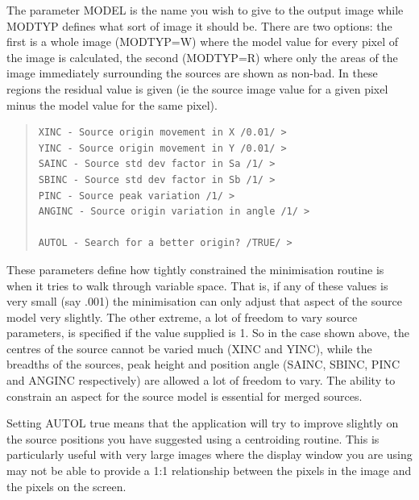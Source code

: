 \documentclass[twoside,11pt]{article}
\newenvironment{myquote}{\begin{quote}\begin{small}}{\end{small}\end{quote}}
\begin{document}
The parameter MODEL is the name you wish to give to the output image while 
MODTYP defines what sort of image it should be. There are two options: the
first is a whole image (MODTYP=W) where the model value for every pixel of the
image is calculated, the second (MODTYP=R) where only the areas of the image
immediately surrounding the sources are shown as non-bad. In these regions the 
residual value is given (ie the source image value for a given pixel
minus the model value for the same pixel).

\begin{myquote}
\begin{verbatim}
XINC - Source origin movement in X /0.01/ > 
YINC - Source origin movement in Y /0.01/ > 
SAINC - Source std dev factor in Sa /1/ > 
SBINC - Source std dev factor in Sb /1/ > 
PINC - Source peak variation /1/ > 
ANGINC - Source origin variation in angle /1/ > 
 
AUTOL - Search for a better origin? /TRUE/ > 
\end{verbatim}
\end{myquote}

These parameters define how tightly constrained the minimisation routine
is when it tries to walk through variable space. That is, if any of these
values is very small (say .001) the minimisation can only adjust that
aspect of the source model very slightly. The other extreme, a lot of freedom
to vary source parameters, is specified if the value supplied is 1. So in the 
case shown above, the centres of the source cannot be varied 
much (XINC and YINC), while the breadths of the sources, peak height and 
position angle (SAINC, SBINC, PINC and ANGINC respectively) are allowed
a lot of freedom to vary. The ability to constrain an aspect for the
source model is essential for merged sources. 

Setting AUTOL true means that the application will try to improve slightly 
on the source positions you have suggested using a centroiding routine.
This is particularly useful with very large images where the display
window you  
are using may not be able to provide a 1:1 relationship between the 
pixels in the image and the pixels on the screen.
\end{document}
